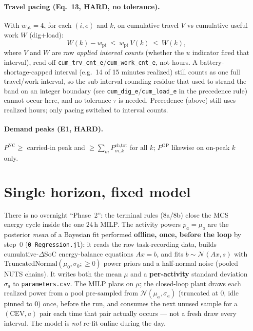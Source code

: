 \documentclass[11pt]{article}
\begin{document}
\paragraph{Travel pacing (Eq.\ 13, HARD, no tolerance).}
With $w_{\text{pt}}=4$, for each $(i,e)$ and $k$, on cumulative travel $V$ vs cumulative
useful work $W$ (dig+load):
\begin{equation}
W(k)-w_{\text{pt}}\ \le\ w_{\text{pt}}\,V(k)\ \le\ W(k),
\end{equation}
where $V$ and $W$ are raw \emph{applied interval counts} (whether the $u$ indicator fired that
interval), read off \texttt{cum\_trv\_cnt\_e}/\texttt{cum\_work\_cnt\_e}, not hours. A battery-
shortage-capped interval (e.g.\ 14 of 15 minutes realized) still counts as one full travel/work
interval, so the sub-interval rounding residue that used to strand the band on an integer boundary
(see \texttt{cum\_dig\_e}/\texttt{cum\_load\_e} in the precedence rule) cannot occur here, and no
tolerance $\tau$ is needed. Precedence (above) still uses realized hours; only pacing switched to
interval counts.

\paragraph{Demand peaks (E1, HARD).}
$P^{\text{NC}}\ge$ carried-in peak and $\ge\sum_m P^{\text{ch,tot}}_{m,k}$ for all $k$;
$P^{\text{OP}}$ likewise on on-peak $k$ only.

\section{Single horizon, fixed model}
There is no overnight ``Phase~2'': the terminal rules (8a/8b) close the MCS energy cycle inside
the one 24\,h MILP. The activity powers $p_a=\mu_a$ are the posterior \emph{mean} of a Bayesian
fit performed \textbf{offline, once, before the loop} by step~0 (\texttt{0\_Regression.jl}): it
reads the raw task-recording data, builds cumulative-$\Delta$SoC energy-balance equations
$A x = b$, and fits $b\sim\mathcal{N}(Ax,s)$ with $\mathrm{TruncatedNormal}(\mu_0,\sigma_0;\ge0)$
power priors and a half-normal noise (pooled NUTS chains). It writes both the mean $\mu$ and a
\textbf{per-activity} standard deviation $\sigma_a$ to \texttt{parameters.csv}. The MILP plans on
$\mu$; the closed-loop plant draws each realized power from a pool pre-sampled from
$\mathcal{N}(\mu_a,\sigma_a)$ (truncated at $0$, idle pinned to $0$) once, before the run, and
consumes the next unused sample for a $(\text{CEV},a)$ pair each time that pair actually occurs
--- not a fresh draw every interval. The model is \emph{not} re-fit online during the day.
\end{document}
